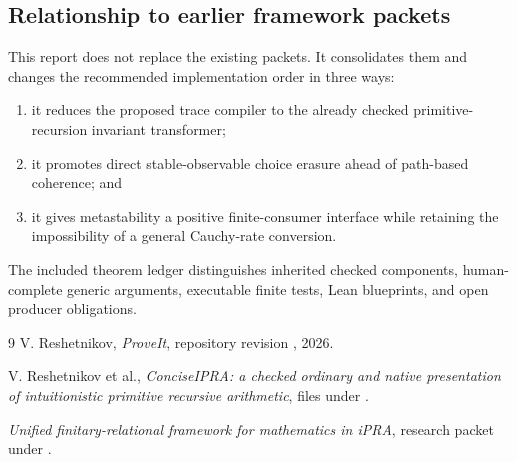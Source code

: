\subsection*{Relationship to earlier framework packets}

This report does not replace the existing packets.  It consolidates them and
changes the recommended implementation order in three ways:
\begin{enumerate}[label=(\arabic*)]
\item it reduces the proposed trace compiler to the already checked
      primitive-recursion invariant transformer;
\item it promotes direct stable-observable choice erasure ahead of path-based
      coherence; and
\item it gives metastability a positive finite-consumer interface while
      retaining the impossibility of a general Cauchy-rate conversion.
\end{enumerate}

The included theorem ledger distinguishes inherited checked components,
human-complete generic arguments, executable finite tests, Lean blueprints, and
open producer obligations.

\begin{thebibliography}{9}
V. Reshetnikov,
\emph{ProveIt}, repository revision
, 2026.

V. Reshetnikov et al.,
\emph{ConciseIPRA: a checked ordinary and native presentation of intuitionistic
primitive recursive arithmetic}, files under
.

\emph{Unified finitary-relational framework for mathematics in iPRA},
research packet under
.
\end{thebibliography}
